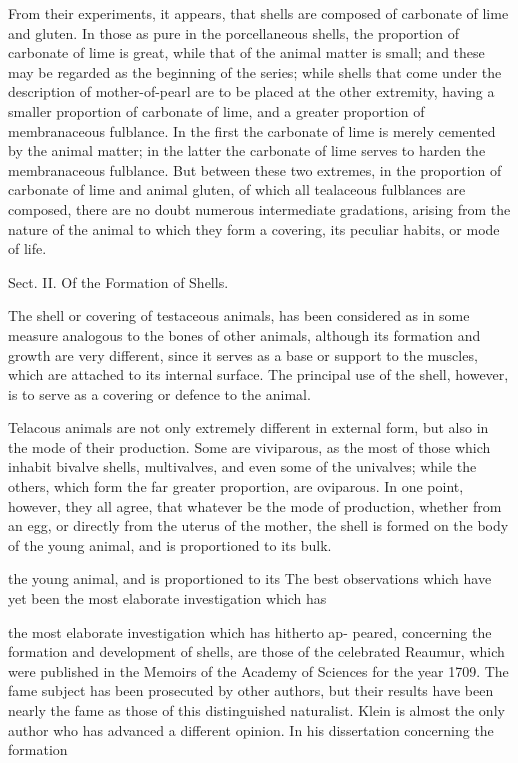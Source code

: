 \documentclass{article}
\begin{document}
From their experiments, it appears, that shells are composed of carbonate of lime and gluten. In those as pure in the porcellaneous shells, the proportion of carbonate of lime is great, while that of the animal matter is small; and these may be regarded as the beginning of the series; while shells that come under the description of mother-of-pearl are to be placed at the other extremity, having a smaller proportion of carbonate of lime, and a greater proportion of membranaceous fulblance. In the first the carbonate of lime is merely cemented by the animal matter; in the latter the carbonate of lime serves to harden the membranaceous fulblance. But between these two extremes, in the proportion of carbonate of lime and animal gluten, of which all tealaceous fulblances are composed, there are no doubt numerous intermediate gradations, arising from the nature of the animal to which they form a covering, its peculiar habits, or mode of life.

Sect. II. Of the Formation of Shells.

The shell or covering of testaceous animals, has been considered as in some measure analogous to the bones of other animals, although its formation and growth are very different, since it serves as a base or support to the muscles, which are attached to its internal surface. The principal use of the shell, however, is to serve as a covering or defence to the animal.

Telacous animals are not only extremely different in external form, but also in the mode of their production. Some are viviparous, as the most of those which inhabit bivalve shells, multivalves, and even some of the univalves; while the others, which form the far greater proportion, are oviparous. In one point, however, they all agree, that whatever be the mode of production, whether from an egg, or directly from the uterus of the mother, the shell is formed on the body of the young animal, and is proportioned to its bulk.

the young animal, and is proportioned to its
The best observations which have yet been
the most elaborate investigation which has

the most elaborate investigation which has hitherto ap-
peared, concerning the formation and development of
shells, are those of the celebrated Reaumur, which were
published in the Memoirs of the Academy of Sciences
for the year 1709. The fame subject has been prosecuted
by other authors, but their results have been nearly
the fame as those of this distinguished naturalist. Klein
is almost the only author who has advanced a different
opinion. In his dissertation concerning the formation
\end{document}
